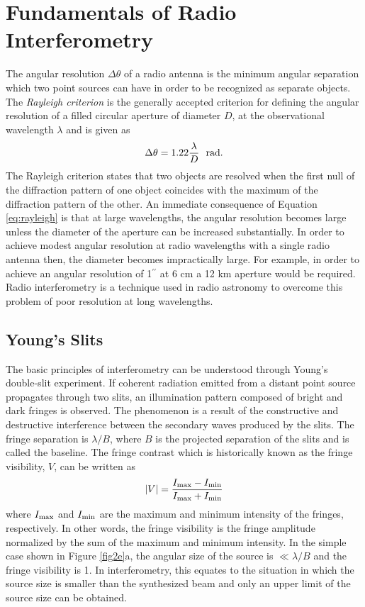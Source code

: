 \section{Fundamentals of Radio Interferometry}\label{sec:3}
The angular resolution $\Delta \theta$ of a radio antenna is the minimum angular separation which two point sources can have in order to be recognized as separate objects. The \textit{Rayleigh criterion} is the generally accepted criterion for defining the angular resolution of a filled circular aperture of diameter $D$, at the observational wavelength $\lambda$ and is given as
\begin{equation}
\Delta \theta=1.22\frac{\lambda}{D} \ \ \rm{rad}.
\label{eq:rayleigh}
\end{equation}
The Rayleigh criterion states that two objects are resolved when the first null of the diffraction pattern of one object coincides with the maximum of the diffraction pattern of the other. An immediate consequence of Equation \ref{eq:rayleigh} is that at large wavelengths, the angular resolution becomes large unless the diameter of the aperture can be increased substantially. In order to achieve modest angular resolution at radio wavelengths with a single radio antenna then, the diameter becomes impractically large. For example, in order to achieve an angular resolution of 1$^{\prime \prime}$ at 6 cm a 12 km aperture would be required. Radio interferometry is a technique used in radio astronomy to overcome this problem of poor resolution at long wavelengths. 

\subsection{Young's Slits}\label{subsec:4}
The basic principles of interferometry can be understood through Young's double-slit experiment. If coherent radiation emitted from a distant point source propagates through two slits, an illumination pattern composed of bright and dark fringes is observed. The phenomenon is a result of the constructive and destructive interference between the secondary waves produced by the slits. The fringe separation is $\lambda /B$, where $B$ is the projected separation of the slits and is called the baseline. The fringe contrast which is historically known as the fringe visibility, $V$, can be written as
\begin{equation}
|V| = \frac{I_{\rm{max}}-I_{\rm{min}}}{I_{\rm{max}} + I_{\rm{min}}}
\end{equation}
where $I_{\rm{max}}$ and $I_{\rm{min}}$ are the maximum and minimum intensity of the fringes, respectively. In other words, the fringe visibility is the fringe amplitude normalized by the sum of the maximum and minimum intensity. In the simple case shown in Figure \ref{fig2e}a, the angular size of the source is  $\ll \lambda/B$ and the fringe visibility is 1. In interferometry, this equates to the situation in which the source size is smaller than the synthesized beam and only an upper limit of the source size can be obtained.


